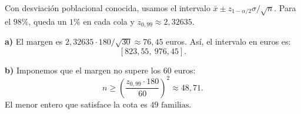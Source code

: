Con desviación poblacional conocida, usamos el intervalo $\bar x\pm z_{1-\alpha/2}\sigma/\sqrt n$. Para el $98\%$, queda un $1\%$ en cada cola y $z_{0{,}99}\approx2{,}32635$.

\textbf{a)} El margen es $2{,}32635\cdot180/\sqrt{30}\approx76{,}45$ euros. Así, el intervalo en euros es:
\[\boxed{[823{,}55,\ 976{,}45]}.\]

\textbf{b)} Imponemos que el margen no supere los $60$ euros:
\[
n\ge\left(\frac{z_{0{,}99}\cdot180}{60}\right)^2\approx48{,}71.
\]
El menor entero que satisface la cota es $\boxed{49\text{ familias}}$.
